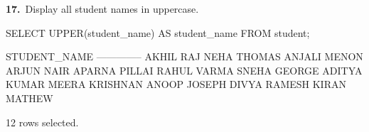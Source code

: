 \noindent\begin{minipage}{\linewidth}
\begingroup{}
{\fontsize{14}{17}\selectfont\textbf{17.}}\ Display all student names in uppercase.\par
\endgroup\vspace{12pt}


\begin{sqlcode}
SELECT UPPER(student_name) AS student_name FROM student;
\end{sqlcode}

\vspace{18pt}


\begin{sqlout}[fontsize=\small]
STUDENT_NAME  
--------------
AKHIL RAJ
NEHA THOMAS
ANJALI MENON
ARJUN NAIR
APARNA PILLAI
RAHUL VARMA
SNEHA GEORGE
ADITYA KUMAR
MEERA KRISHNAN
ANOOP JOSEPH
DIVYA RAMESH
KIRAN MATHEW

12 rows selected.
\end{sqlout}
\end{minipage}\par\vspace{24pt}

